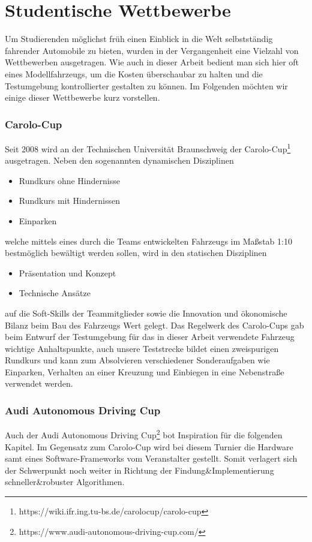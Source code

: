 \section{Studentische Wettbewerbe \dcsecondauthorshort}
Um Studierenden möglichst früh einen Einblick in die Welt selbstständig fahrender Automobile zu bieten, wurden in der Vergangenheit eine Vielzahl von Wettbewerben ausgetragen. Wie auch in dieser Arbeit bedient man sich hier oft eines Modellfahrzeugs, um die Kosten überschaubar zu halten und die Testumgebung kontrollierter gestalten zu können. Im Folgenden möchten wir einige dieser Wettbewerbe kurz vorstellen.
\subsubsection{Carolo-Cup}
Seit 2008 wird an der Technischen Universität Braunschweig der Carolo-Cup\footnote{https://wiki.ifr.ing.tu-bs.de/carolocup/carolo-cup} ausgetragen. Neben den sogenannten dynamischen Disziplinen
\begin{itemize}
\item Rundkurs ohne Hindernisse
\item Rundkurs mit Hindernissen
\item Einparken
\end{itemize}
welche mittels eines durch die Teams entwickelten Fahrzeugs im Maßstab 1:10 bestmöglich bewältigt werden sollen, wird in den statischen Disziplinen
\begin{itemize}
\item Präsentation und Konzept
\item Technische Ansätze
\end{itemize}
auf die Soft-Skills der Teammitglieder sowie die Innovation und ökonomische Bilanz beim Bau des Fahrzeugs Wert gelegt. Das Regelwerk des Carolo-Cups gab beim Entwurf der Testumgebung für das in dieser Arbeit verwendete Fahrzeug wichtige Anhaltspunkte, auch unsere Teststrecke bildet einen zweispurigen Rundkurs und kann zum Absolvieren verschiedener Sonderaufgaben wie Einparken, Verhalten an einer Kreuzung und Einbiegen in eine Nebenstraße verwendet werden.

\subsubsection{Audi Autonomous Driving Cup}
Auch der Audi Autonomous Driving Cup\footnote{https://www.audi-autonomous-driving-cup.com/} bot Inspiration für die folgenden Kapitel. Im Gegensatz zum Carolo-Cup wird bei diesem Turnier die Hardware samt eines Software-Frameworks vom Veranstalter gestellt. Somit verlagert sich der Schwerpunkt noch weiter in Richtung der Findung\&Implementierung schneller\&robuster Algorithmen. 

